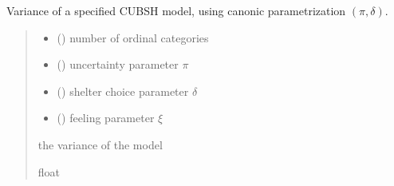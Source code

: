 \documentclass[letterpaper,10pt,english]{sphinxmanual}
\begin{document}
\begin{fulllineitems}
\label{\detokenize{cubmods:cubmods.cubsh.var_delta}}
\pysigstartsignatures
{}
\pysigstopsignatures
\sphinxAtStartPar
Variance of a specified CUBSH model,
using canonic parametrization \((\pi, \delta)\).
\begin{quote}\begin{description}
\begin{itemize}
\item {} 
\sphinxAtStartPar
{} () \textendash{} number of ordinal categories

\item {} 
\sphinxAtStartPar
{} () \textendash{} uncertainty parameter \(\pi\)

\item {} 
\sphinxAtStartPar
{} () \textendash{} shelter choice parameter \(\delta\)

\item {} 
\sphinxAtStartPar
{} () \textendash{} feeling parameter \(\xi\)

\end{itemize}

\sphinxAtStartPar
the variance of the model

\sphinxAtStartPar
float

\end{description}\end{quote}

\end{fulllineitems}

\end{document}
